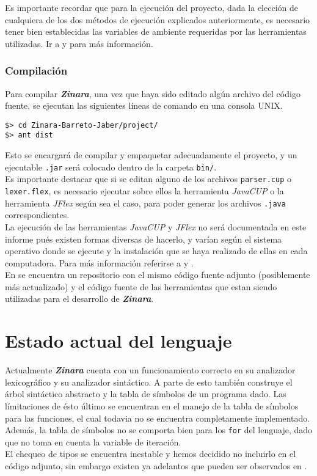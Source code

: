 \documentclass[12pt, spanish]{report}
\begin{document}
Es importante recordar que para la ejecución del proyecto, dada la
elección de cualquiera de los dos métodos de ejecución explicados
anteriormente, es necesario tener bien establecidas las variables de
ambiente requeridas por las herramientas utilizadas. Ir a
\cite{javacup} y \cite{jflex} para más información.

\subsection{Compilación}
\label{sec:zcompilacion}
Para compilar \emph{\textbf{Zinara}}, una vez que haya sido editado
algún archivo del código fuente, se ejecutan las siguientes líneas de
comando en una consola UNIX.

\begin{verbatim}
$> cd Zinara-Barreto-Jaber/project/
$> ant dist
\end{verbatim}

Esto se encargará de compilar y empaquetar adecuadamente el proyecto,
y un ejecutable \texttt{.jar} será colocado dentro de la carpeta
\texttt{bin/}.\\

Es importante destacar que si se editan alguno de los archivos
\texttt{parser.cup} o \texttt{lexer.flex}, es necesario ejecutar sobre
ellos la herramienta \emph{JavaCUP} o la herramienta \emph{JFlex}
según sea el caso, para poder generar los archivos \texttt{.java}
correspondientes.\\

La ejecución de las herramientas \emph{JavaCUP} y \emph{JFlex} no será
documentada en este informe pués existen formas diversas de hacerlo, y
varían según el sistema operativo donde se ejecute y la instalación
que se haya realizado de ellas en cada computadora. Para más
información referirse a \cite{javacup} y \cite{jflex}.\\

En \cite{github} se encuentra un repositorio con el mismo código
fuente adjunto (posiblemente más actualizado) y el código fuente de
las herramientas que estan siendo utilizadas para el desarrollo de
\emph{\textbf{Zinara}}.

\chapter{Estado actual del lenguaje}
\label{chap:estado}

Actualmente \emph{\textbf{Zinara}} cuenta con un funcionamiento
correcto en su analizador lexicográfico y su analizador sintáctico. A
parte de esto también construye el árbol sintáctico abstracto y la
tabla de símbolos de un programa dado. Las límitaciones de ésto último
se encuentran en el manejo de la tabla de símbolos para las funciones,
el cual todavia no se encuentra completamente implementado. Además,
la tabla de símbolos no se comporta bien para los \texttt{for} del
lenguaje, dado que no toma en cuenta la variable de iteración.\\

El chequeo de tipos se encuentra inestable y hemos decidido no
incluirlo en el código adjunto, sin embargo existen ya adelantos que
pueden ser observados en \cite{github}.



\end{document}
